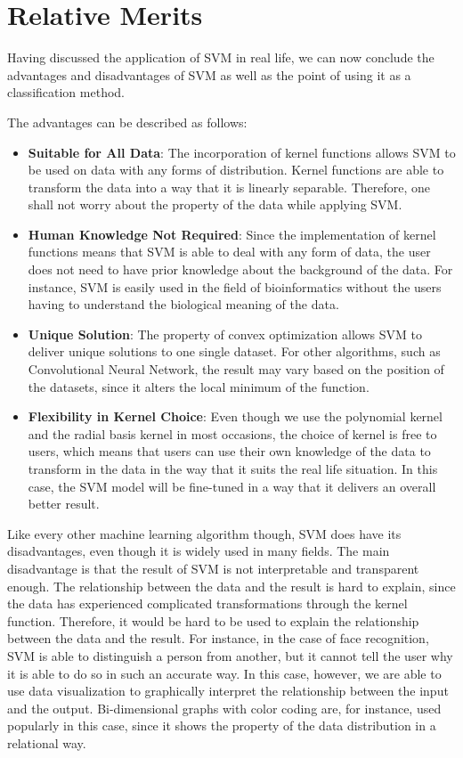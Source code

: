 \section{Relative Merits}
Having discussed the application of SVM in real life, we can now conclude
the advantages and disadvantages of SVM as well as the point of using it 
as a classification method. 

The advantages can be described as follows:
\begin{itemize}
    \item \textbf{Suitable for All Data}: The incorporation of kernel functions
    allows SVM to be used on data with any forms of distribution. Kernel functions
    are able to transform the data into a way that it is linearly separable. Therefore,
    one shall not worry about the property of the data while applying SVM.
    \item \textbf{Human Knowledge Not Required}: Since the implementation of kernel functions
    means that SVM is able to deal with any form of data, the user does not need to 
    have prior knowledge about the background of the data. For instance, SVM is easily
    used in the field of bioinformatics without the users having to understand the 
    biological meaning of the data.
    \item \textbf{Unique Solution}: The property of convex optimization allows SVM
    to deliver unique solutions to one single dataset. For other algorithms, 
    such as Convolutional Neural Network, the result may vary based on the position of
    the datasets, since it alters the local minimum of the function.
    \item \textbf{Flexibility in Kernel Choice}: Even though we use the polynomial
    kernel and the radial basis kernel in most occasions, the choice of kernel is
    free to users, which means that users can use their own knowledge of the data
    to transform in the data in the way that it suits the real life situation. In this
    case, the SVM model will be fine-tuned in a way that it delivers an overall better
    result.
\end{itemize}

Like every other machine learning algorithm though,
SVM does have its disadvantages, even though it is widely used in many
fields. The main disadvantage is that the result of SVM is not 
interpretable and transparent enough. The relationship between the data
and the result is hard to explain, since the data has experienced 
complicated transformations through the kernel function.
Therefore, it would be hard to be used to explain
the relationship between the data and the result. For instance,
in the case of face recognition, SVM is able to distinguish
a person from another, but it cannot tell the user why it is
able to do so in such an accurate way. In this case, however, 
we are able to use data visualization to graphically interpret the relationship
between the input and the output. Bi-dimensional graphs with color coding are, 
for instance, used popularly in this case, since it shows the property of
the data distribution in a relational way. 
\cite{procon}
